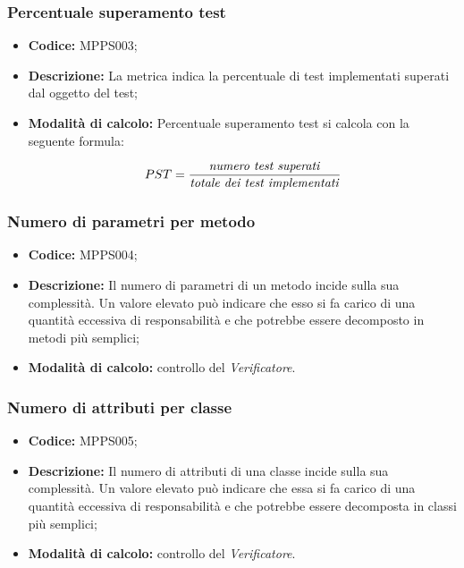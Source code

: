 \documentclass[../NormediProgetto.tex]{subfiles}
\begin{document}
\subsubsection{Percentuale superamento test}

\begin{itemize}
	\item \textbf{Codice:} MPPS003;
	\item \textbf{Descrizione:} La metrica indica la percentuale di test implementati superati dal oggetto del test;
	\item \textbf{Modalità di calcolo:} Percentuale superamento test si calcola con la seguente formula:
	
	\[ PST = \frac{\textrm{\textit{numero test superati}}}{\textrm{\textit{totale dei test implementati}}} \]
\end{itemize}

\subsubsection{Numero di parametri per metodo}

\begin{itemize}
	\item \textbf{Codice:} MPPS004;
	
	\item \textbf{Descrizione:} Il numero di parametri di un metodo incide sulla sua complessità. Un valore elevato può indicare che esso si fa carico di una quantità eccessiva di responsabilità e che potrebbe essere decomposto in metodi più semplici;
	
	\item \textbf{Modalità di calcolo:} controllo del \textit{Verificatore}.
\end{itemize}

\subsubsection{Numero di attributi per classe}

\begin{itemize}
	\item \textbf{Codice:} MPPS005;
	
	\item \textbf{Descrizione:} Il numero di attributi di una classe incide sulla sua complessità. Un valore elevato può indicare che essa si fa carico di una quantità eccessiva di responsabilità e che potrebbe essere decomposta in classi più semplici;
	
	\item \textbf{Modalità di calcolo:} controllo del \textit{Verificatore}.
\end{itemize}
\end{document}
